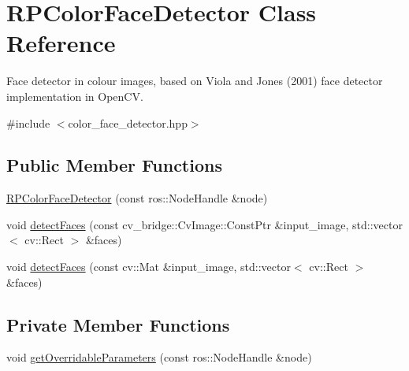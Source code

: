 \hypertarget{class_r_p_color_face_detector}{\section{\-R\-P\-Color\-Face\-Detector \-Class \-Reference}
\label{class_r_p_color_face_detector}
}


\-Face detector in colour images, based on \-Viola and \-Jones (2001) face detector implementation in \-Open\-C\-V.  




{\ttfamily \#include $<$color\-\_\-face\-\_\-detector.\-hpp$>$}

\subsection*{\-Public \-Member \-Functions}
\begin{DoxyCompactItemize}
\item 
\hyperlink{class_r_p_color_face_detector_a2822056221a0a6dd1d5e387c71e0a7dc}{\-R\-P\-Color\-Face\-Detector} (const ros\-::\-Node\-Handle \&node)
\item 
void \hyperlink{class_r_p_color_face_detector_a80d45d6a227ad41f31483a7d85a9bc9a}{detect\-Faces} (const cv\-\_\-bridge\-::\-Cv\-Image\-::\-Const\-Ptr \&input\-\_\-image, std\-::vector$<$ cv\-::\-Rect $>$ \&faces)
\item 
void \hyperlink{class_r_p_color_face_detector_aa156cf14c4cf0f2fe2f58d1c9ce297a7}{detect\-Faces} (const cv\-::\-Mat \&input\-\_\-image, std\-::vector$<$ cv\-::\-Rect $>$ \&faces)
\end{DoxyCompactItemize}
\subsection*{\-Private \-Member \-Functions}
\begin{DoxyCompactItemize}
\item 
void \hyperlink{class_r_p_color_face_detector_ab730fa54b6c1ef6224d6577736970ecc}{get\-Overridable\-Parameters} (const ros\-::\-Node\-Handle \&node)
\end{DoxyCompactItemize}
